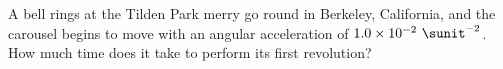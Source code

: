 A bell rings at the Tilden Park merry go round in Berkeley, California,
and the carousel begins to move with an angular acceleration of
$1.0\times10^{-2}\ \sunit^{-2}$. How much time does it take to perform
its first revolution?\answercheck

